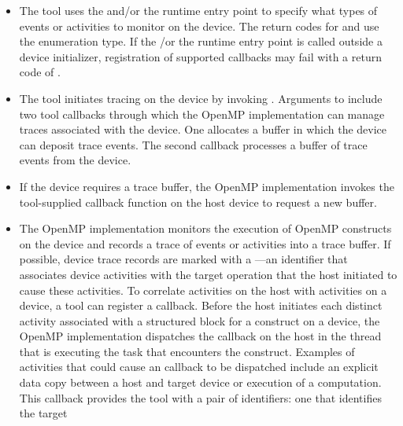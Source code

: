\begin{itemize}
\begin{table}
\end{table}

\item The tool uses the  and/or the 
       runtime entry point to specify what
      types of events or activities to monitor on the device. The return
      codes for  and 
      use the  enumeration type. If the 
       /or the  
      runtime entry point is called outside a device initializer, 
      registration of supported callbacks may fail with a return code of
      .
\item The tool initiates tracing on the device by invoking 
      . Arguments to  include 
      two tool callbacks through which the OpenMP implementation can manage 
      traces associated with the device. One allocates a buffer in which the 
      device can deposit trace events. The second callback processes a buffer 
      of trace events from the device.
\item If the device requires a trace buffer, the OpenMP implementation invokes
      the tool-supplied callback function on the host device to request a new 
      buffer.
\item The OpenMP implementation monitors the execution of OpenMP constructs on
      the device and records a trace of events or activities into a trace 
      buffer. If possible, device trace records are marked with a 
      ---an identifier that associates device activities with 
      the target operation that the host initiated to cause these activities. 
      To correlate activities on the host with activities on a device, a tool 
      can register a  callback. Before the 
      host initiates each distinct activity associated with a structured block
      for a  construct on a device, the OpenMP implementation 
      dispatches the  callback on the host 
      in the thread that is executing the task that encounters the 
       construct. Examples of activities that could cause an 
      callback to be dispatched include an explicit data copy between a host 
      and target device or execution of a computation. This callback provides 
      the tool with a pair of identifiers: one that identifies the target 

\end{itemize}
